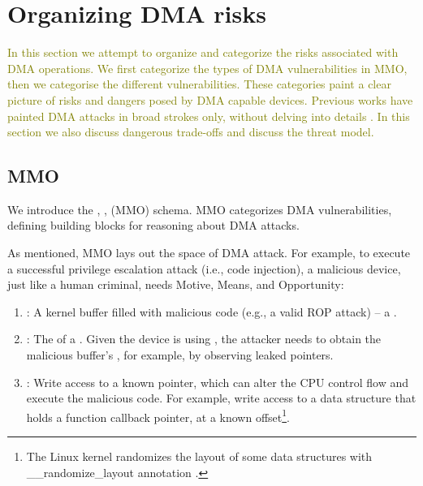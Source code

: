 
\section{Organizing DMA risks}\label{sec:dma-risks}
\textcolor{olive}{In this section we attempt to organize and categorize the risks associated with DMA operations.
We first categorize the types of DMA vulnerabilities in MMO, then we categorise the different \subpage{} vulnerabilities. These categories paint a clear picture of risks and dangers posed by DMA capable devices.
Previous works have painted DMA attacks in broad strokes only, without delving into details \cite{MMT16,MSMT18,thunder}. 
In this section we also discuss dangerous trade-offs and discuss the threat model.}

\subsection{MMO}\label{sec:mmo}

We introduce the \motivation, \means, \oportunity (MMO) schema. MMO categorizes DMA vulnerabilities, defining building blocks for reasoning about DMA attacks. 

As mentioned, MMO lays out the space of DMA attack.
For example, to execute a successful privilege escalation attack (i.e., code injection), a malicious device, just like a human criminal, needs Motive, Means, and Opportunity:
\begin{enumerate}
    \item \motivation: A kernel buffer filled with malicious code (e.g., a valid ROP attack) -- a \mabaf.
    \item \means: The \kva{} of a \mabaf. Given the device is using \iova, the attacker needs to obtain the malicious buffer's \kva{}, for example, by observing leaked pointers. 
    \item \oportunity: Write access to a known pointer, which can alter the CPU control flow and execute the malicious code. For example, write access to a data structure that holds a function callback pointer, at a known offset\footnote{The Linux kernel randomizes the layout of some data structures with \_\_randomize\_layout annotation \cite{rand_layout}.}.
\end{enumerate}

